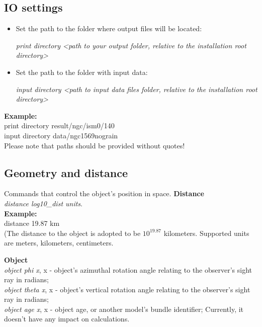 \documentclass[a4paper]{article}
\begin{document}
\subsection{IO settings}
\begin{itemize}
    \item Set the path to the folder where output files will be located: \\
    \centerline{\it print directory <path to your output folder, relative to the installation root directory>}
    \item Set the path to the folder with input data: \\
    \centerline{\it input directory <path to input data files folder, relative to the installation root directory>}
\end{itemize}
{\bf Example:} \\
\vspace{0.5cm}
\hspace{1cm} print directory result/ngc/ism0/140 \\
\hspace{1cm} input directory data/ngc1569nograin \\
Please note that paths should be provided without quotes!\\

\subsection{Geometry and distance}
Commands that control the object's position in space.
    {\bf Distance}\\
    {\it distance log10\_dist units}.\\

    {\bf Example:}\\
distance 19.87 km \\
(The distance to the object is adopted to be $10^{19.87}$ kilometers.
Supported units are meters, kilometers, centimeters.

    {\bf Object}\\
    {\it object phi x}, x - object's azimuthal rotation angle relating to the observer's sight ray in radians;\\
    {\it object theta x}, x - object's vertical rotation angle relating to the observer's sight ray in radians;\\
    {\it object age x}, x - object age, or another model's bundle identifier; Currently, it doesn't have any impact on calculations.\\
\end{document}
